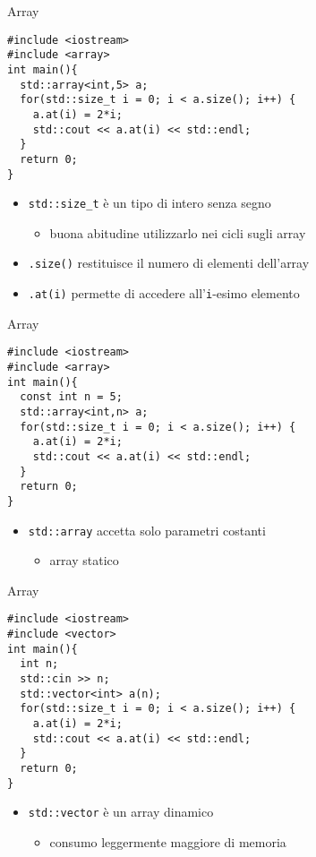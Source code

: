 \begin{frame}[fragile]{Array}
  \vfill
  \begin{lstlisting}
#include <iostream>
#include <array>
int main(){
  std::array<int,5> a;
  for(std::size_t i = 0; i < a.size(); i++) {
    a.at(i) = 2*i;
    std::cout << a.at(i) << std::endl;
  }
  return 0;
}
  \end{lstlisting}
  \vfill
  \begin{itemize}
    \item \lstinline$std::size_t$ è un tipo di intero senza segno
    \begin{itemize}
      \item buona abitudine utilizzarlo nei cicli sugli array
    \end{itemize}
    \vfill
    \item \lstinline$.size()$ restituisce il numero di elementi dell'array
    \vfill
    \item \lstinline$.at(i)$ permette di accedere all'\lstinline$i$-esimo elemento
  \end{itemize}
  \vfill
\end{frame}

\begin{frame}[fragile]{Array}
  \vfill
  \begin{lstlisting}
#include <iostream>
#include <array>
int main(){
  const int n = 5;
  std::array<int,n> a;
  for(std::size_t i = 0; i < a.size(); i++) {
    a.at(i) = 2*i;
    std::cout << a.at(i) << std::endl;
  }
  return 0;
}
  \end{lstlisting}
  \vfill
  \begin{itemize}
    \item \lstinline$std::array$ accetta solo parametri costanti
    \begin{itemize}
      \item array \alert{statico}
    \end{itemize}
  \end{itemize}
  \vfill
\end{frame}

\begin{frame}[fragile]{Array}
  \vfill
  \begin{lstlisting}
#include <iostream>
#include <vector>
int main(){
  int n;
  std::cin >> n;
  std::vector<int> a(n);
  for(std::size_t i = 0; i < a.size(); i++) {
    a.at(i) = 2*i;
    std::cout << a.at(i) << std::endl;
  }
  return 0;
}
  \end{lstlisting}
  \vfill
  \begin{itemize}
    \item \lstinline$std::vector$ è un array \alert{dinamico}
    \begin{itemize}
      \item consumo leggermente maggiore di memoria
    \end{itemize}
  \end{itemize}
  \vfill
\end{frame}

